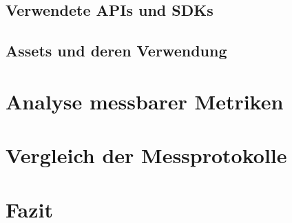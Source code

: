 \section{Verwendete APIs und SDKs}
\section{Assets und deren Verwendung}

\chapter{Analyse messbarer Metriken}

\chapter{Vergleich der Messprotokolle}

\chapter{Fazit}




\listoffigures %

\begin{thebibliography}{}
	
\end{thebibliography}
\clearpage\thispagestyle{empty}
\eigen  %
